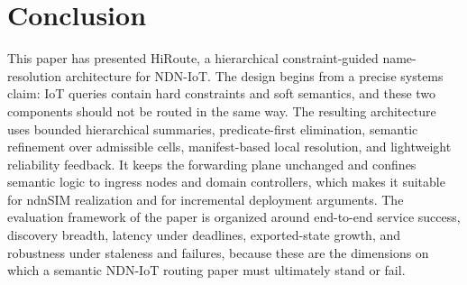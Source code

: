 \documentclass[journal]{IEEEtran}
\newcommand{\sysname}{HiRoute}
\begin{document}
\section{Conclusion}

This paper has presented \sysname{}, a hierarchical constraint-guided name-resolution architecture for NDN-IoT. The design begins from a precise systems claim: IoT queries contain hard constraints and soft semantics, and these two components should not be routed in the same way. The resulting architecture uses bounded hierarchical summaries, predicate-first elimination, semantic refinement over admissible cells, manifest-based local resolution, and lightweight reliability feedback. It keeps the forwarding plane unchanged and confines semantic logic to ingress nodes and domain controllers, which makes it suitable for ndnSIM realization and for incremental deployment arguments. The evaluation framework of the paper is organized around end-to-end service success, discovery breadth, latency under deadlines, exported-state growth, and robustness under staleness and failures, because these are the dimensions on which a semantic NDN-IoT routing paper must ultimately stand or fail.
\end{document}
